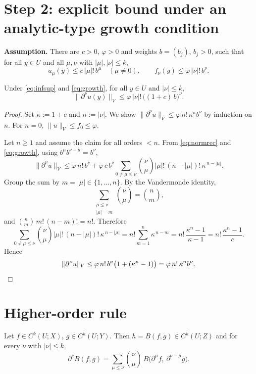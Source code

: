 \section*{Step 2: explicit bound under an analytic-type growth condition}

\textbf{Assumption.} There are $c>0$, $\varphi>0$ and weights $b=(b_j)$, $b_j>0$, such that for all
$y\in U$ and all $\mu,\nu$ with $|\mu|,|\nu|\le k$,
\begin{equation}\label{eq:growth}
  a_\mu(y)\le c\,|\mu|!\,b^\mu\quad(\mu\ne0),\qquad
  f_\nu(y)\le\varphi\,|\nu|!\,b^\nu .
\end{equation}

\begin{theorem}\label{thm:main}
Under \eqref{eq:infsup} and \eqref{eq:growth}, for all $y\in U$ and $|\nu|\le k$,
\begin{equation}\label{eq:main}
  \|\partial^\nu u(y)\|_V\le\varphi\,|\nu|!\,\big((1+c)\,b\big)^\nu .
\end{equation}
\end{theorem}

\begin{proof}
Set $\kappa:=1+c$ and $n:=|\nu|$. We show $\|\partial^\nu u\|_V\le\varphi\,n!\,\kappa^n b^\nu$
by induction on $n$. For $n=0$, $\|u\|_V\le f_0\le\varphi$.

Let $n\ge1$ and assume the claim for all orders $<n$. From \eqref{eq:normrec} and \eqref{eq:growth},
using $b^\mu b^{\nu-\mu}=b^\nu$,
\[
  \|\partial^\nu u\|_V
  \le\varphi\,n!\,b^\nu+\varphi\,c\,b^\nu\sum_{0\ne\mu\le\nu}\binom{\nu}{\mu}|\mu|!\,(n-|\mu|)!\,\kappa^{\,n-|\mu|}.
\]
Group the sum by $m=|\mu|\in\{1,\dots,n\}$. By the Vandermonde identity,
\[
  \sum_{\substack{\mu\le\nu\\|\mu|=m}}\binom{\nu}{\mu}=\binom{n}{m},
\]
and $\binom{n}{m}\,m!\,(n-m)!=n!$. Therefore
\[
  \sum_{0\ne\mu\le\nu}\binom{\nu}{\mu}|\mu|!\,(n-|\mu|)!\,\kappa^{\,n-|\mu|}
  =n!\sum_{m=1}^{n}\kappa^{\,n-m}=n!\,\frac{\kappa^n-1}{\kappa-1}=n!\,\frac{\kappa^n-1}{c}.
\]
Hence
\[
  \|\partial^\nu u\|_V\le\varphi\,n!\,b^\nu\big(1+(\kappa^n-1)\big)=\varphi\,n!\,\kappa^n b^\nu .
  \qedhere
\]
\end{proof}


\section*{Higher-order rule}

\begin{theorem}\label{thm:leibniz}
Let $f\in C^k(U;X)$, $g\in C^k(U;Y)$. Then $h=B(f,g)\in C^k(U;Z)$ and for every
$\nu$ with $|\nu|\le k$,
\begin{equation}\label{eq:leibniz}
  \partial^\nu B(f,g)=\sum_{\mu\le\nu}\binom{\nu}{\mu}\,B\big(\partial^\mu f,\ \partial^{\nu-\mu}g\big).
\end{equation}
\end{theorem}

